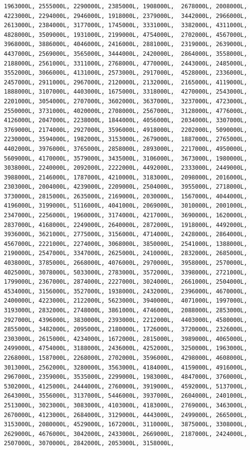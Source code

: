\documentclass[
]{article}
\begin{document}
\begin{verbatim}
1963000L, 2555000L, 2290000L, 2385000L, 1908000L,  2678000L, 2008000L, 4223000L, 2294000L, 2946000L, 1918000L, 2379000L,  3442000L, 2966000L, 2613000L, 2384000L, 3177000L, 1745000L, 3331000L,  3382000L, 4311000L, 4828000L, 3509000L, 1931000L, 2199000L, 4754000L,  2702000L, 4567000L, 3968000L, 3886000L, 4046000L, 2416000L, 2881000L,  2319000L, 2639000L, 4437000L, 2569000L, 3565000L, 3444000L, 2420000L,  2864000L, 3558000L, 2188000L, 2561000L, 3311000L, 2768000L, 4770000L,  2443000L, 2485000L, 3552000L, 3066000L, 4131000L, 2573000L, 2917000L,  4528000L, 2336000L, 2457000L, 2911000L, 2967000L, 2120000L, 2132000L,  2165000L, 4119000L, 1888000L, 3107000L, 4403000L, 1675000L, 3318000L,  4270000L, 2543000L, 2201000L, 3054000L, 2707000L, 3602000L, 3637000L,  3237000L, 4723000L, 2550000L, 3731000L, 4020000L, 2708000L, 2567000L,  3128000L, 4776000L, 4126000L, 2047000L, 2238000L, 1844000L, 4056000L,  2034000L, 3307000L, 3769000L, 2174000L, 2927000L, 3596000L, 4918000L,  2202000L, 5090000L, 2230000L, 3594000L, 1982000L, 3153000L, 2679000L,  1887000L, 2765000L, 4402000L, 3976000L, 3765000L, 2858000L, 2893000L,  2217000L, 4950000L, 5609000L, 4170000L, 3579000L, 3435000L, 3106000L,  3673000L, 1980000L, 3038000L, 2240000L, 2092000L, 2222000L, 4492000L,  2333000L, 2449000L, 3988000L, 2146000L, 1787000L, 4210000L, 3183000L,  2098000L, 2016000L, 2303000L, 2004000L, 4239000L, 2209000L, 2504000L,  3955000L, 2718000L, 3730000L, 2815000L, 2635000L, 2169000L, 2030000L,  1567000L, 4044000L, 4196000L, 3199000L, 5116000L, 4041000L, 2069000L,  3010000L, 2001000L, 2347000L, 2256000L, 1960000L, 3174000L, 4217000L,  3690000L, 1620000L, 2837000L, 4168000L, 2249000L, 2640000L, 2872000L,  1918000L, 4492000L, 3936000L, 3621000L, 2775000L, 3156000L, 4714000L,  2428000L, 2864000L, 4567000L, 2221000L, 2274000L, 3068000L, 3850000L,  2541000L, 1388000L, 2190000L, 2547000L, 3347000L, 2625000L, 2410000L,  2832000L, 2685000L, 4038000L, 3785000L, 2668000L, 4076000L, 2970000L,  3958000L, 2570000L, 4025000L, 3078000L, 5033000L, 2783000L, 3572000L,  3398000L, 2721000L, 1799000L, 2367000L, 2874000L, 2227000L, 3024000L,  2661000L, 2504000L, 4534000L, 3156000L, 3527000L, 1938000L, 2432000L,  2396000L, 4670000L, 2400000L, 4223000L, 2122000L, 5623000L, 3940000L,  4071000L, 1997000L, 3193000L, 2832000L, 2748000L, 3861000L, 4746000L,  2088000L, 2853000L, 2927000L, 4396000L, 3830000L, 2393000L, 2212000L,  4403000L, 4580000L, 2855000L, 3482000L, 2095000L, 2180000L, 1726000L,  3720000L, 2326000L, 2303000L, 2615000L, 4234000L, 1672000L, 2815000L,  3989000L, 4065000L, 2499000L, 4754000L, 3188000L, 2436000L, 4252000L,  3250000L, 1963000L, 2268000L, 1587000L, 2268000L, 2702000L, 3596000L,  4298000L, 4608000L, 3013000L, 2562000L, 3280000L, 3563000L, 4184000L,  4159000L, 4916000L, 2967000L, 2359000L, 3535000L, 2299000L, 1983000L,  4847000L, 3760000L, 5302000L, 4125000L, 2444000L, 2760000L, 3919000L,  4592000L, 5137000L, 2643000L, 3556000L, 3137000L, 5446000L, 3937000L,  2604000L, 2401000L, 2513000L, 3023000L, 3083000L, 4103000L, 4183000L,  2769000L, 3463000L, 2670000L, 4123000L, 2684000L, 3129000L, 4443000L,  2499000L, 2665000L, 3153000L, 2080000L, 4529000L, 1672000L, 3110000L,  3875000L, 3308000L, 2629000L, 4676000L, 3042000L, 2433000L, 2669000L,  2187000L, 2424000L, 2507000L, 3070000L, 2842000L, 2053000L, 3158000L,  
\end{verbatim}
\end{document}
